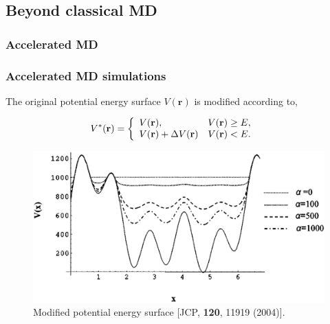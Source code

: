 \documentclass{beamer}
\begin{document}
\subsection{Beyond classical MD} 
\subsubsection{Accelerated MD} 
\begin{frame}
\frametitle{Accelerated MD simulations}

The original potential energy surface $V(\mathbf{r})$ is modified according to,

\begin{equation}                                                                                                                                            
\label{Eq:ipspot}          
V^*(\mathbf{r})= \left\{ 
\begin{array}{l l} V(\mathbf{r}), &  V(\mathbf{r}) \ge E, \quad \\
V(\mathbf{r}) + \Delta V(\mathbf{r})& V(\mathbf{r}) < E. \quad 
\end{array} \right.
\end{equation}

\begin{figure}
\includegraphics[scale=0.08]{accmd.eps}
\caption{{\scriptsize  Modified potential energy surface [JCP, {\bf 120}, 11919 (2004)]. }}
\end{figure}

\end{frame}
\end{document}
